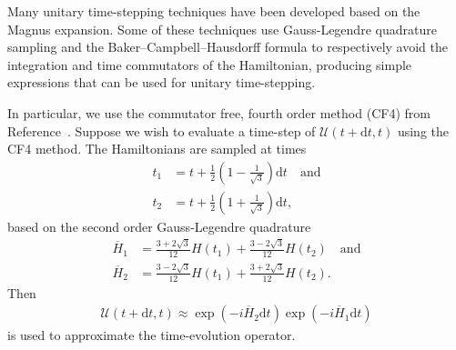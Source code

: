 \documentclass{jors}
\begin{document}
		Many unitary time-stepping techniques have been developed based on the Magnus expansion\cite{auer_magnus_2018}.
		Some of these techniques use Gauss-Legendre quadrature sampling and the Baker–Campbell–Hausdorff formula to respectively avoid the integration and time commutators of the Hamiltonian, producing simple expressions that can be used for unitary time-stepping\cite{blanes_fourth-_2006}.
		
		In particular, we use the commutator free, fourth order method (CF4) from Reference~\cite{auer_magnus_2018}.
		Suppose we wish to evaluate a time-step of $ \mathcal{U}(t + \mathrm{d}t, t) $ using the CF4 method.
		The Hamiltonians are sampled at times
		\begin{align}
			t_1 &= t + \frac12 \left(1 - \frac{1}{\sqrt{3}}\right)\mathrm{d}t\quad\text{and}\\
			t_2 &= t + \frac12 \left(1 + \frac{1}{\sqrt{3}}\right)\mathrm{d}t,
		\end{align} %
		based on the second order Gauss-Legendre quadrature
		\begin{align}
			\overline{H}_1 &= \frac{3 + 2\sqrt{3}}{12}H(t_1) + \frac{3 - 2\sqrt{3}}{12}H(t_2)\quad\text{and}\label{eq:cf4_sample_1}\\
			\overline{H}_2 &= \frac{3 - 2\sqrt{3}}{12}H(t_1) + \frac{3 + 2\sqrt{3}}{12}H(t_2).\label{eq:cf4_sample_2}
		\end{align}
		Then
		\begin{align}
			\mathcal{U}(t + \mathrm{d}t, t) \approx \exp(-i\overline{H}_2\mathrm{d}t)\exp(-i\overline{H}_1\mathrm{d}t)\label{eq:cf4_implementation}
		\end{align}%
		is used to approximate the time-evolution operator.
\end{document}
